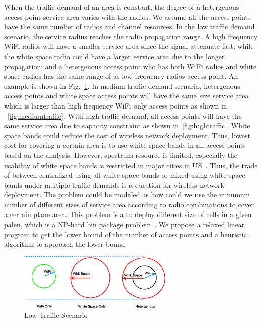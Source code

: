 When the traffic demand of an area is constant, the degree of a hetergenous access point service area 
varies with the radios. We assume all the access points have the same number of radios and channel 
resources.
In the low traffic demand scenario, the service radius reaches the radio propagation range.
A high frequency WiFi radios will have a smaller service area since the signal attenuate fast; while the white
space radio could have a larger service area due to the longer propagation; and a hetergenous access point who has
both WiFi radios and white space radios has the same range of as low frequency radios access point. An example is
shown in Fig.~\ref{fig:lowtraffic}.
In medium traffic demand scenario, hetergenous access points and white space access points will 
have the same size service area which is larger than high frequency WiFi only access points as shown in 
~\ref{fig:mediumtraffic}.
With high traffic demand, all access points will have the same service area due to capacity constraint 
as shown in~\ref{fig:hightraffic}. White space bands could reduce the cost of wireless network deployment. 
Thus, lowest cost for covering a certain area is to use white space bands in all access points 
based on the analysis. However, spectrum resource is limited, especially the usability
of white space bands is restricted in major cities in US~\cite{msdatabase}. 
Thus, the trade of between centralized using all white space bands or mixed using white space
bands under multiple traffic demands is a question for wireless network deployment. The problem
could be modeled as how could we use the minumum number of different sizes of service area according to 
radio combinations to cover a certain plane area. This problem is a to deploy different size of cells in 
a given palen, which is a NP-hard bin package problem~\cite{martello1998exact}. We propose a relaxed 
linear program to get the lower bound of the number of access points and a heuristic algorithm to 
approach the lower bound.



\begin{figure}
\centering
\includegraphics[width=74mm]{figures/lowtraffic}
\vspace{-0.1in}
\caption{Low Traffic Scenario}                                                                 
\label{fig:lowtraffic}
\vspace{-0.1in}
\end{figure}

